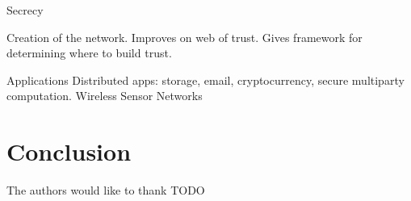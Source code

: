 \documentclass[prodmode,permissions]{acmsmall-ec16}
\begin{document}
Secrecy

Creation of the network.
Improves on web of trust.
Gives framework for determining where to build trust.

Applications
Distributed apps: storage, email, cryptocurrency, secure multiparty computation.
Wireless Sensor Networks

\section{Conclusion}

\begin{acks}
The authors would like to thank TODO
\end{acks}



\end{document}
